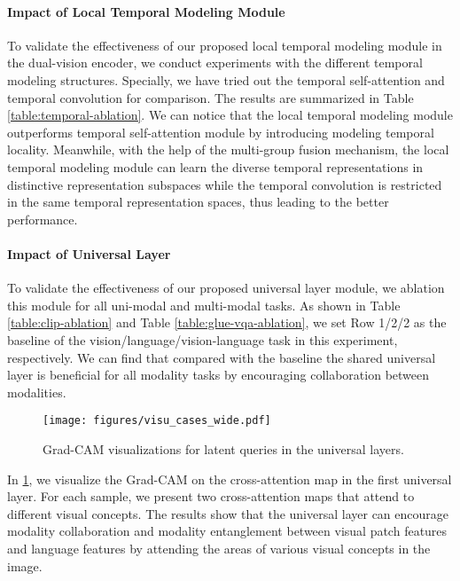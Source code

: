 \documentclass{article}
\theoremstyle{plain}
\theoremstyle{definition}
\theoremstyle{remark}
\begin{document}
\paragraph{Impact of Local Temporal Modeling Module}
To validate the effectiveness of our proposed local temporal modeling module in the dual-vision encoder, we conduct experiments with the different temporal modeling structures. Specially, we have tried out the temporal self-attention and temporal convolution for comparison. The results are summarized in Table \ref{table:temporal-ablation}. We can notice that the local temporal modeling module outperforms temporal self-attention module by introducing modeling temporal locality. Meanwhile, with the help of the multi-group fusion mechanism, the local temporal modeling module can learn the diverse temporal representations in distinctive representation subspaces while the temporal convolution is restricted in the same temporal representation spaces, thus leading to the better performance.

\paragraph{Impact of Universal Layer}
To validate the effectiveness of our proposed universal layer module, we ablation this module for all uni-modal and multi-modal tasks. 
As shown in Table \ref{table:clip-ablation} and Table \ref{table:glue-vqa-ablation}, we set Row 1/2/2 as the baseline of the vision/language/vision-language task in this experiment, respectively.
We can find that compared with the baseline the shared universal layer is beneficial for all modality tasks by encouraging collaboration between modalities.

\begin{figure}
    \centering
    \texttt{[image: figures/visu\_cases\_wide.pdf]}
\caption{Grad-CAM visualizations for latent queries in the universal layers.}
\vspace{-2ex}
\label{fig:latent_visu}
\end{figure}
In \cref{fig:latent_visu}, we visualize the Grad-CAM on the cross-attention map in the first universal layer. For each sample, we present two cross-attention maps that attend to different visual concepts. The results show that the universal layer can encourage modality collaboration and modality entanglement between visual patch features and language features by attending the areas of various visual concepts in the image.
\end{document}
